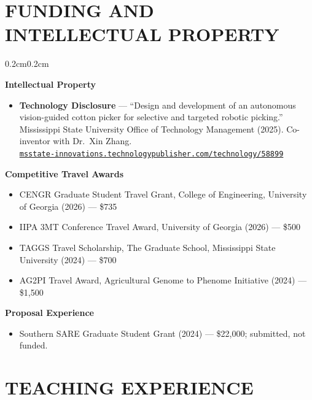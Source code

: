\documentclass[10pt, letterpaper]{article}
\newenvironment{highlights}{%
    \begin{itemize}[topsep=0.08cm, parsep=0.08cm, partopsep=0pt,
                    itemsep=0pt, leftmargin=0.4cm + 10pt]
}{\end{itemize}}
\newenvironment{onecolentry}{%
    \begin{adjustwidth}{0.2cm}{0.2cm}
}{\end{adjustwidth}}
\begin{document}
\section{FUNDING AND INTELLECTUAL PROPERTY}
\vspace{0.08cm}
\begin{onecolentry}
    \textbf{Intellectual Property}
    \begin{highlights}
        \item \textbf{Technology Disclosure} --- ``Design and development of an
              autonomous vision-guided cotton picker for selective and targeted
              robotic picking.'' Mississippi State University Office of Technology
              Management (2025). Co-inventor with Dr.\ Xin Zhang.
              \\ \href{https://msstate-innovations.technologypublisher.com/technology/58899}{\texttt{msstate-innovations.technologypublisher.com/technology/58899}}
    \end{highlights}
    \vspace{0.10cm}
    \textbf{Competitive Travel Awards}
    \begin{highlights}
        \item CENGR Graduate Student Travel Grant, College of Engineering,
              University of Georgia (2026) --- \$735
        \item IIPA 3MT Conference Travel Award, University of Georgia (2026) --- \$500
        \item TAGGS Travel Scholarship, The Graduate School, Mississippi State
              University (2024) --- \$700
        \item AG2PI Travel Award, Agricultural Genome to Phenome Initiative
              (2024) --- \$1{,}500
    \end{highlights}
    \vspace{0.10cm}
    \textbf{Proposal Experience}
    \begin{highlights}
        \item Southern SARE Graduate Student Grant (2024) --- \$22{,}000;
              submitted, not funded.
    \end{highlights}
\end{onecolentry}
\vspace{0.18cm}

\section{TEACHING EXPERIENCE}
\vspace{0.08cm}
\end{document}
